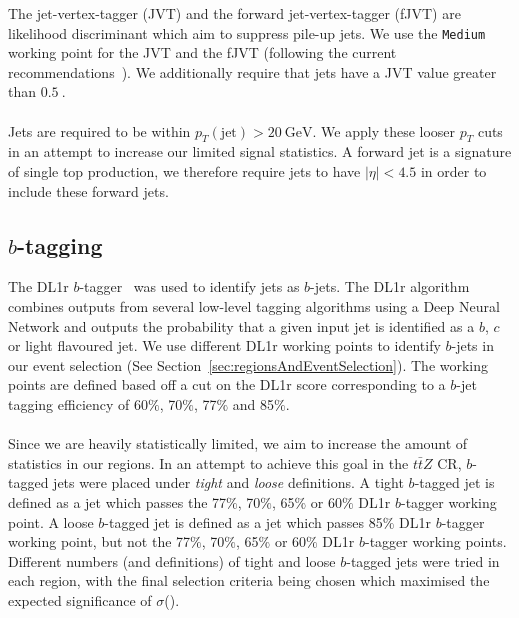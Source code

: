 The jet-vertex-tagger (JVT) and the forward jet-vertex-tagger (fJVT) are likelihood discriminant which aim to suppress pile-up jets. We use the \texttt{Medium} working point for the JVT and the fJVT (following the current recommendations~\cite{JVTandfJVT-Recommendations}). We additionally require that jets have a JVT value greater than $\SI{0.5}{}$.\\\\
 
Jets are required to be within $p_{T}(\text{jet}) > \SI{20}{\GeV}$. We apply these looser $p_T$ cuts in an attempt to increase our limited signal statistics. A forward jet is a signature of single top production, we therefore require jets to have $|\eta| < 4.5$ in order to include these forward jets.



\subsection{$b$-tagging}
The DL1r $b$-tagger~\cite{DL1r-paper} was used to identify jets as $b$-jets. The DL1r algorithm combines outputs from several low-level tagging algorithms using a Deep Neural Network and outputs the probability that a given input jet is identified as a $b$, $c$ or light flavoured jet. We use different DL1r working points to identify $b$-jets in our event selection (See Section~\ref{sec:regionsAndEventSelection}). The working points are defined based off a cut on the DL1r score corresponding to a $b$-jet tagging efficiency of 60$\%$, 70$\%$, 77$\%$ and 85$\%$. \\\\
Since we are heavily statistically limited, we aim to increase the amount of statistics in our regions. In an attempt to achieve this goal in the $t\bar{t}Z$ CR, $b$-tagged jets were placed under \textit{tight} and \textit{loose} definitions. A tight $b$-tagged jet is defined as a jet which passes the 77$\%$, 70$\%$, 65$\%$ or 60$\%$ DL1r $b$-tagger working point. A loose $b$-tagged jet is defined as a jet which passes 85$\%$ DL1r $b$-tagger working point, but not the 77$\%$, 70$\%$, 65$\%$ or 60$\%$ DL1r $b$-tagger working points. Different numbers (and definitions) of tight and loose $b$-tagged jets were tried in each region, with the final selection criteria being chosen which maximised the expected significance of $\sigma$(\tWZ).





